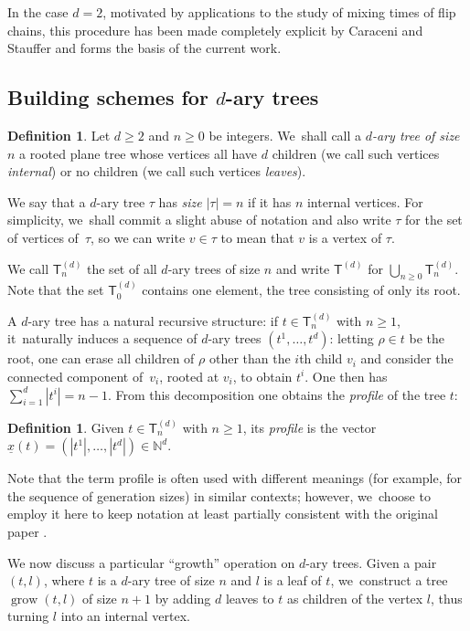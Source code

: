\documentclass[11pt]{article}
\newcommand{\Subsection}{\subsection}
\newcommand{\sT}{\mathsf{T}}
\newcommand{\grow}{\operatorname{grow}}
\theoremstyle{definition}
\newtheorem{defn}[thm]{Definition}
\begin{document}
In the case $d=2$, motivated by applications to the study of mixing times of flip chains, this procedure has been made completely explicit by Caraceni and Stauffer \cite{CS20} and forms the basis of the current work.

\Subsection{Building schemes for $d$-ary trees}

\begin{defn}\label{def:complete d-ary tree}
Let $d\!\geq\! 2$ and $n\!\geq\! 0$ be integers. We~shall call a \emph{$d$-ary tree of size~$n$} a rooted plane tree whose vertices all have $d$ children (we call such vertices \emph{internal}) or no children (we call such vertices \emph{leaves}).

We say that a $d$-ary tree $\tau$ has \emph{size} $|\tau|=n$ if it has $n$ internal vertices. For simplicity, we~shall commit a slight abuse of notation and also write $\tau$ for the set of vertices of~$\tau$, so we can write $v\in \tau$ to mean that $v$ is a vertex of $\tau$.

We call $\sT_n^{(d)}$ the set of all $d$-ary trees of size $n$ and write $\sT^{(d)}$ for $\bigcup_{n\geq 0}\sT_n^{(d)}$. Note that the set $\sT^{(d)}_0$ contains one element, the tree consisting of only its root.
\end{defn}

A $d$-ary tree has a natural recursive structure: if $t\in\sT_n^{(d)}$ with $n\geq 1$, it~naturally induces a sequence of $d$-ary trees $(t^1,\ldots, t^d)$: letting $\rho\in t$ be the root, one can erase all children of $\rho$ other than the $i$th child $v_i$ and consider the connected component of~$v_i$, rooted at $v_i$, to obtain $t^i$. One then has $\sum_{i=1}^d|t^i|=n-1$. From this decomposition one obtains the \emph{profile} of the tree $t$:

\begin{defn}
Given $t\in \sT_n^{(d)}$ with $n\geq 1$, its \emph{profile} is the vector $\underline{x}(t)=(|t^1|,\ldots,|t^d|)\in \mathbb{N}^d$.	
\end{defn}

Note that the term profile is often used with different meanings (for example, for the sequence of generation sizes) in similar contexts; however, we~choose to employ it here to keep notation at least partially consistent with the original paper \cite{LW04}.

We now discuss a particular ``growth'' operation on $d$-ary trees. Given a pair $(t,l)$, where $t$ is a $d$-ary tree of size $n$ and $l$ is a leaf of $t$, we~construct a tree $\grow(t,l)$ of size $n+1$ by adding $d$ leaves to $t$ as children of the vertex $l$, thus turning $l$ into an internal vertex.
\end{document}

